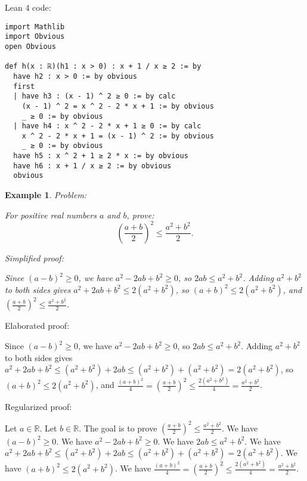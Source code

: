 \documentclass{article}
\newtheorem{example}{Example}
\begin{document}
Lean 4 code:
\begin{tcolorbox}[colback=white!10, width=\linewidth]
\begin{lstlisting}[language=Lean4]
import Mathlib
import Obvious
open Obvious

def h(x : ℝ)(h1 : x > 0) : x + 1 / x ≥ 2 := by
  have h2 : x > 0 := by obvious
  first
  | have h3 : (x - 1) ^ 2 ≥ 0 := by calc
    (x - 1) ^ 2 = x ^ 2 - 2 * x + 1 := by obvious
    _ ≥ 0 := by obvious
  | have h4 : x ^ 2 - 2 * x + 1 ≥ 0 := by calc
    x ^ 2 - 2 * x + 1 = (x - 1) ^ 2 := by obvious
    _ ≥ 0 := by obvious
  have h5 : x ^ 2 + 1 ≥ 2 * x := by obvious
  have h6 : x + 1 / x ≥ 2 := by obvious
  obvious

\end{lstlisting}
\end{tcolorbox}


\begin{example}
Problem:
\begin{tcolorbox}[colback=yellow!10, width=\linewidth]
For positive real numbers $a$ and $b$, prove:
    $$\left(\frac{a+b}{2}\right)^2 \leq \frac{a^2+b^2}{2}.$$
\end{tcolorbox}

Simplified proof:
\begin{tcolorbox}[colback=blue!10, width=\linewidth]
Since $(a-b)^2 \ge 0$, we have $a^2 - 2ab + b^2 \ge 0$, so $2ab \leq a^2 + b^2$.
Adding $a^2+b^2$ to both sides gives $a^2 + 2ab + b^2 \leq 2(a^2+b^2)$, so $(a+b)^2 \leq 2(a^2+b^2)$, and $\left(\frac{a+b}{2}\right)^2 \leq \frac{a^2+b^2}{2}$.
\end{tcolorbox}
\end{example}

Elaborated proof:
\begin{tcolorbox}[colback=green!10, width=\linewidth]
Since $(a-b)^2 \ge 0$, we have $a^2 - 2ab + b^2 \ge 0$, so $2ab \leq a^2 + b^2$.
Adding $a^2+b^2$ to both sides gives $a^2 + 2ab + b^2 \leq (a^2 + b^2) + 2ab \leq (a^2+b^2) + (a^2+b^2) = 2(a^2+b^2)$, so $(a+b)^2 \leq 2(a^2+b^2)$, and $\frac{(a+b)^2}{4} = \left(\frac{a+b}{2}\right)^2 \leq \frac{2(a^2+b^2)}{4} = \frac{a^2+b^2}{2}$.
\end{tcolorbox}

Regularized proof:
\begin{tcolorbox}[colback=red!10, width=\linewidth]
Let $a\in\mathbb{R}$.
Let $b\in\mathbb{R}$.
The goal is to prove ${\left(\frac{a+b}{2}\right)}^2 \leq \frac{a^2+b^2}{2}$.
We have ${(a-b)}^2 \ge 0$.
We have $a^2 - 2ab + b^2 \ge 0$.
We have $2ab \leq a^2 + b^2$.
We have $a^2 + 2ab + b^2 \leq (a^2 + b^2) + 2ab \leq (a^2+b^2) + (a^2+b^2) = 2(a^2+b^2)$.
We have ${(a+b)}^2 \leq 2(a^2+b^2)$.
We have $\frac{{(a+b)}^2}{4} = {\left(\frac{a+b}{2}\right)}^2 \leq \frac{2(a^2+b^2)}{4} = \frac{a^2+b^2}{2}$.
\end{tcolorbox}
\end{document}

